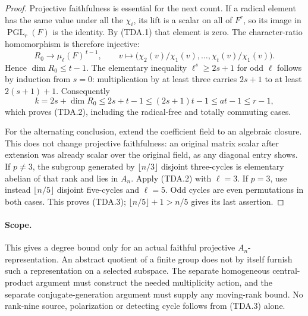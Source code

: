 \begin{proof}
Projective faithfulness is essential for the next count. If a
radical element has the same value under all the $\chi_i$,
its lift is a scalar on all of $F^r$, so its image in
$\operatorname{PGL}_r(F)$ is the identity. By (TDA.1) that
element is zero. The character-ratio homomorphism is therefore
injective:
\[
 R_0\longrightarrow\mu_\ell(F)^{\,t-1},\qquad
 v\longmapsto
   \bigl(\chi_2(v)/\chi_1(v),\ldots,\chi_t(v)/\chi_1(v)\bigr).
 \tag{TDA.7}
\]
Hence $\dim R_0\le t-1$.
The elementary inequality $\ell^s\ge2s+1$ for odd $\ell$
follows by induction from $s=0$: multiplication by at least
three carries $2s+1$ to at least $2(s+1)+1$. Consequently
\[
 k=2s+\dim R_0
       \le2s+t-1
       \le(2s+1)t-1
       \le at-1
       \le r-1,
 \tag{TDA.8}
\]
which proves (TDA.2), including the radical-free and totally
commuting cases.

For the alternating conclusion, extend the coefficient field to
an algebraic closure. This does not change projective faithfulness:
an original matrix scalar after extension was already scalar
over the original field, as any diagonal entry shows.
If $p\ne3$, the subgroup generated by $\lfloor n/3\rfloor$
disjoint three-cycles is elementary abelian of that rank and
lies in $A_n$. Apply (TDA.2) with $\ell=3$.
If $p=3$, use instead $\lfloor n/5\rfloor$ disjoint five-cycles
and $\ell=5$. Odd cycles are even permutations in both cases.
This proves (TDA.3); $\lfloor n/5\rfloor+1>n/5$ gives its
last assertion.
\end{proof}

\paragraph{Scope.}
This gives a degree bound only for an actual faithful projective
$A_n$-representation. An abstract quotient of a finite group
does not by itself furnish such a representation on a selected
subspace. The separate homogeneous central-product argument
must construct the needed multiplicity action, and the separate
conjugate-generation argument must supply any moving-rank bound.
No rank-nine source, polarization or detecting cycle follows
from (TDA.3) alone.
